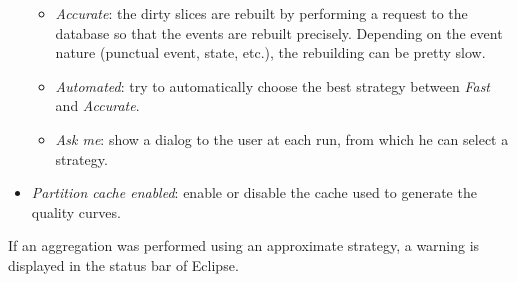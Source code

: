 \documentclass[twoside]{article}
\begin{document}
\begin{sloppypar}
\begin{itemize}
\begin{itemize}
		\item \textit{Accurate}: the dirty slices are rebuilt by performing a request to the database so that the events are rebuilt precisely. Depending on the event nature (punctual event, state, etc.), the rebuilding can be pretty slow.
		\item \textit{Automated}: try to automatically choose the best strategy between \textit{Fast} and \textit{Accurate}. 
		\item \textit{Ask me}: show a dialog to the user at each run, from which he can select a strategy.
	\end{itemize}   
	\item \textit{Partition cache enabled}: enable or disable the cache used to generate the quality curves.
\end{itemize} 

If an aggregation was performed using an approximate strategy, a warning is displayed in the status bar of Eclipse.


\end{sloppypar}
\end{document}
